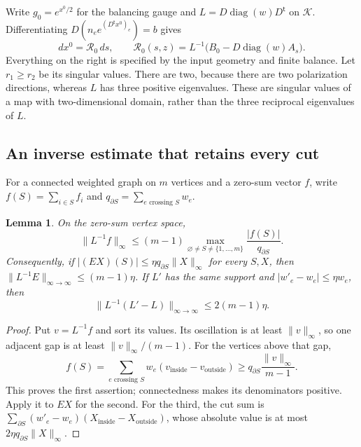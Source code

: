 \documentclass[11pt]{amsart}
\newtheorem{lemma}[theorem]{Lemma}
\theoremstyle{definition}
\theoremstyle{remark}
\newcommand{\diag}{\operatorname{diag}}
\newcommand{\cK}{\mathcal K}
\newcommand{\cR}{\mathcal R}
\begin{document}
Write $g_0=e^{x^0/2}$ for the balancing gauge and
$L=D\diag(w)D^{\mathsf t}$ on $\cK$. Differentiating
$D(n_e e^{(D^{\mathsf t}x^0)_e})=b$ gives
\begin{equation}\label{eq:finite-response}
 dx^0=\cR_0\,ds,\qquad
 \cR_0(s,z)=L^{-1}\bigl(B_0-D\diag(w)A_s\bigr).
\end{equation}
Everything on the right is specified by the input geometry and finite
balance. Let $r_1\ge r_2$ be its singular values. There are two, because
there are two polarization directions, whereas $L$ has three
positive eigenvalues. These are singular values of a map with two-dimensional
domain, rather than the three reciprocal eigenvalues of $L$.

\subsection{An inverse estimate that retains every cut}
For a connected weighted graph on $m$ vertices and a zero-sum vector $f$,
write $f(S)=\sum_{i\in S}f_i$ and
$q_{\partial S}=\sum_{e\text{ crossing }S}w_e$.

\begin{lemma}\label{lem:graph-inverse}
On the zero-sum vertex space,
\begin{equation}\label{eq:graph-inverse}
 \|L^{-1}f\|_\infty\le(m-1)
 \max_{\varnothing\ne S\ne\{1,\ldots,m\}}
                   \frac{|f(S)|}{q_{\partial S}}.
\end{equation}
Consequently, if $|(EX)(S)|\le\eta q_{\partial S}\|X\|_\infty$
for every $S,X$, then $\|L^{-1}E\|_{\infty\to\infty}\le(m-1)\eta$.
If $L'$ has the same support and $|w'_e-w_e|\le\eta w_e$, then
\begin{equation}\label{eq:graph-weight-derivative}
 \|L^{-1}(L'-L)\|_{\infty\to\infty}\le2(m-1)\eta.
\end{equation}
\end{lemma}

\begin{proof}
Put $v=L^{-1}f$ and sort its values. Its oscillation is at least
$\|v\|_\infty$, so one adjacent gap is at least
$\|v\|_\infty/(m-1)$. For the vertices above that gap,
\[
 f(S)=\sum_{e\text{ crossing }S}w_e(v_{\mathrm{inside}}-v_{\mathrm{outside}})
 \ge q_{\partial S}\frac{\|v\|_\infty}{m-1}.
\]
This proves the first assertion; connectedness makes its denominators
positive. Apply it to $EX$ for the second. For the third, the cut sum is
$\sum_{\partial S}(w'_e-w_e)(X_{\mathrm{inside}}-X_{\mathrm{outside}})$,
whose absolute value is at most $2\eta q_{\partial S}\|X\|_\infty$.
\end{proof}
\end{document}
